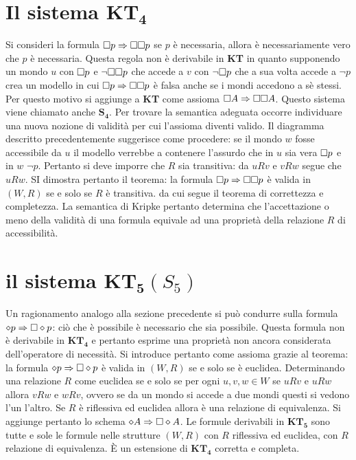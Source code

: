 \section{Il sistema $\mathbf{KT_4}$}
Si consideri la formula $\Box p\Rightarrow\Box\Box p$ se $p$ \`e necessaria, allora \`e necessariamente vero che $p$ \`e necessaria. Questa regola non \`e derivabile in \textbf{KT} in quanto supponendo un
mondo $u$ con $\Box p$ e $\neg\Box\Box p$ che accede a $v$ con $\neg\Box p$ che a sua volta accede a $\neg p$ crea un modello in cui $\Box p\Rightarrow\Box\Box p$ \`e falsa anche se i mondi 
accedono a s\`e stessi. Per questo motivo si aggiunge a \textbf{KT} come assioma $\Box A\Rightarrow\Box\Box A$. Questo sistema viene chiamato anche $\mathbf{S_4}$. Per trovare la semantica adeguata
occorre individuare una nuova nozione di validit\`a per cui l'assioma diventi valido. Il diagramma descritto precedentemente suggerisce come procedere: se il mondo $w$ fosse accessibile da $u$ il modello
verrebbe a contenere l'assurdo che in $u$ sia vera $\Box p$ e in $w$ $\neg p$. Pertanto si deve imporre che $R$ sia transitiva: da $uRv$ e $vRw$ segue che $uRw$. SI dimostra pertanto il teorema: la 
formula $\Box p\Rightarrow\Box\Box p$ \`e valida in $(W, R)$ se e solo se $R$ \`e transitiva. da cui segue il teorema di correttezza e completezza. La semantica di Kripke pertanto determina che 
l'accettazione o meno della validit\`a di una formula equivale ad una propriet\`a della relazione $R$ di accessibilit\`a. 
\section{il sistema $\mathbf{KT_5}(S_5)$}
Un ragionamento analogo alla sezione precedente si pu\`o condurre sulla formula $\diamond p\Rightarrow\Box\diamond p$: ci\`o che \`e possibile \`e necessario che sia possibile. Questa formula non \`e derivabile in 
$\mathbf{KT_4}$ e pertanto esprime una propriet\`a non ancora considerata dell'operatore di necessit\`a. Si introduce pertanto come assioma grazie al teorema: la formula $\diamond p\Rightarrow\Box\diamond p$ 
\`e valida in $(W,R)$ se e solo se \`e euclidea. Determinando una relazione $R$ come euclidea se e solo se per ogni $u,v,w\in W$ se $uRv$ e $uRw$ allora $vRw$ e $wRv$, ovvero se da un mondo si accede a 
due mondi questi si vedono l'un l'altro. Se $R$ \`e riflessiva ed euclidea allora \`e una relazione di equivalenza. Si aggiunge pertanto lo schema $\diamond A\Rightarrow \Box\diamond A$. Le formule derivabili in 
$\mathbf{KT_5}$ sono tutte e sole le formule nelle strutture $(W, R)$ con $R$ riflessiva ed euclidea, con $R$ relazione di equivalenza. \`E un estensione di $\mathbf{KT_4}$ corretta e completa.
